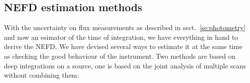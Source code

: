 

\subsection{NEFD estimation methods}
\label{se:nefd_estimation_methods}

With the uncertainty on flux measurements as described in sect.~\ref{se:photometry} and
now an esimator of the time of integration, we have everything in hand to derive
the NEFD. We have devised several ways to estimate it at the same time as
checking the good behaviour of the instrument. Two methods are based on deep
integrations on a source, one is based on the joint analysis of multiple scans
without combining them:

